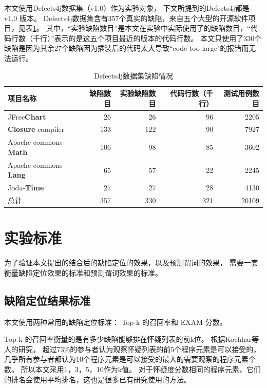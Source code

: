 本文使用Defects4j数据集\parencite{Just2014Defects4J}（v1.0）作为实验对象，
下文所提到的Defects4j都是 v1.0 版本。
Defects4j数据集含有357个真实的缺陷，来自五个大型的开源软件项目，见表\ref{defects4j_details}。
其中，“实验缺陷数目”是本文在实验中实际使用了的缺陷数目，“代码行数（千行）”表示的是这五个项目最近的版本的代码行数。
本文只使用了330个缺陷是因为其余27个缺陷因为插装后的代码太大导致“code too large"的报错而无法运行。

\begin{table}
\centering
\begin{tabular}{|l|r|r|r|r|}
\hline
项目名称 & 缺陷数目 & 实验缺陷数目 & 代码行数（千行） & 测试用例数目 \\
\hline
JFree\textbf{Chart} & 26 & 26 & 96 & 2205 \\
\hline
\textbf{Closure} compiler & 133 & 122 & 90 & 7927 \\
\hline
Apache commons-\textbf{Math} & 106 & 98 & 85 & 3602 \\
\hline
Apache commons-\textbf{Lang} & 65 & 57 & 22 & 2245 \\
\hline
Joda-\textbf{Time} & 27 & 27 & 28 & 4130 \\
\hline
总计 & 357 & 330 & 321 & 20109 \\
\hline
\end{tabular}
\caption{Defects4j数据集缺陷情况}
\label{defects4j_details}
\end{table}

\section{实验标准}

为了验证本文提出的结合后的缺陷定位的效果，以及预测谓词的效果，
需要一套衡量缺陷定位效果的标准和预测谓词效果的标准。

\subsection{缺陷定位结果标准}

本文使用两种常用的缺陷定位标准： Top-k 的召回率和 EXAM 分数。

Top-k 的召回率衡量的是有多少缺陷能够排在怀疑列表的前k位。
根据Kochhar等人的研究\parencite{Kochhar2016Practitioners}，
超过73\%的参与者认为观察怀疑列表的前5个程序元素是可以接受的，
几乎所有参与者都认为10个程序元素是可以接受的最大的需要观察的程序元素个数。
所以本文采用1，3，5，10作为k值。
对于怀疑度分数相同的程序元素，它们的排名会使用平均排名，这也是很多已有研究使用的方法\parencite{Pearson2017Evaluating,Xuan2014Learning,Steimann2013Threats,Wong2016A}。

